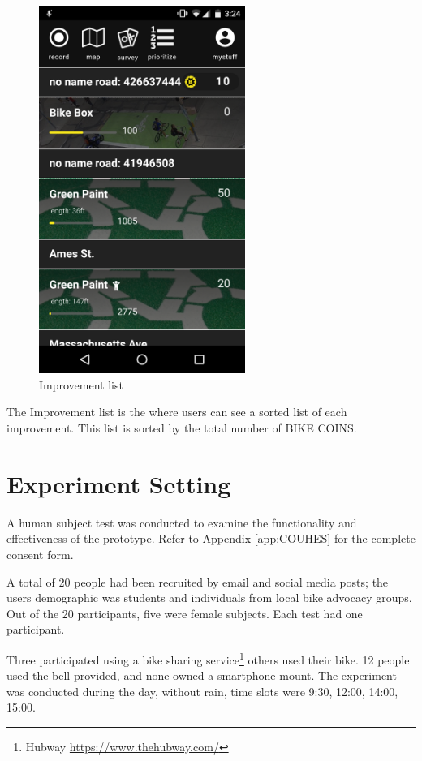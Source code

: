 \begin{figure}[!htb]
  \includegraphics[width=0.6\textwidth]{chapters/4/fig/interface_list.png}               
  \caption[interface: Improvement list]{Improvement list}
  \label{fig:interface_list}
\end{figure}

The Improvement list is the where users can see a sorted list of each
improvement.
This list is sorted by the total number of BIKE COINS.

\section{Experiment Setting}

A human subject test was conducted to examine the functionality
and effectiveness of the prototype. Refer to Appendix \ref{app:COUHES} for
the complete consent form.

A total of 20 people had been recruited by email and social media posts;
the users demographic was students and individuals from local bike advocacy
groups. Out of the 20 participants, five were female subjects. Each test
had one participant.

Three participated using a bike sharing service\footnote{Hubway
\url{https://www.thehubway.com/}} others used their bike. 12 people used
the bell provided, and none owned a smartphone mount. The experiment was
conducted during the day, without rain, time slots were 9:30, 12:00, 14:00,
15:00.

